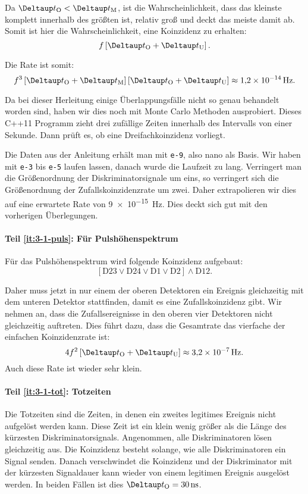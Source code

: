 \documentclass[11pt, ngerman, fleqn, DIV=15, headinclude, BCOR=2cm]{scrreprt}
\begin{document}
Da $\DtO < \DtM$, ist die Wahrscheinlichkeit, dass das kleinste komplett
innerhalb des größten ist, relativ groß und deckt das meiste damit ab. Somit
ist hier die Wahrscheinlichkeit, eine Koinzidenz zu erhalten:
\[
    f \sbr{\DtO + \DtU}.
\]

Die Rate ist somit:
\[
    f^3 \sbr{\DtO + \DtM} \sbr{\DtO + \DtU} \approx \SI{1.2e-14}{\hertz}.
\]

Da bei dieser Herleitung einige Überlappungsfälle nicht so genau behandelt
worden sind, haben wir dies noch mit Monte Carlo Methoden ausprobiert. Dieses
C++11 Programm zieht drei zufällige Zeiten innerhalb des Intervalls von einer
Sekunde. Dann prüft es, ob eine Dreifachkoinzidenz vorliegt.



Die Daten aus der Anleitung erhält man mit \texttt{e-9}, also nano als Basis.
Wir haben mit \texttt{e-3} bis \texttt{e-5} laufen lassen, danach wurde die
Laufzeit zu lang. Verringert man die Größenordnung der Diskriminatorsignale um
eins, so verringert sich die Größenordnung der Zufallskoinzidenzrate um zwei.
Daher extrapolieren wir dies auf eine erwartete Rate von \SI{9e-15}{\hertz}.
Dies deckt sich gut mit den vorherigen Überlegungen.

\paragraph{Teil \ref{it:3-1-puls}: Für Pulshöhenspektrum}

Für das Pulshöhenspektrum wird folgende Koinzidenz aufgebaut:
\[
    [\mathrm D23 \lor \mathrm D24 \lor \mathrm D1 \lor \mathrm D2] \land
    \mathrm D12.
\]

Daher muss jetzt in nur einem der oberen Detektoren ein Ereignis gleichzeitig
mit dem unteren Detektor stattfinden, damit es eine Zufallskoinzidenz gibt. Wir
nehmen an, dass die Zufallsereignisse in den oberen vier Detektoren nicht
gleichzeitig auftreten. Dies führt dazu, dass die Gesamtrate das vierfache der
einfachen Koinzidenzrate ist:
\[
    4 f^2 \sbr{\DtO + \DtU} \approx \SI{3.2e-7}{\hertz}.
\]
Auch diese Rate ist wieder sehr klein.

\paragraph{Teil \ref{it:3-1-tot}: Totzeiten}

Die Totzeiten sind die Zeiten, in denen ein zweites legitimes Ereignis nicht
aufgelöst werden kann. Diese Zeit ist ein klein wenig größer als die Länge des
kürzesten Diskriminatorsignals. Angenommen, alle Diskriminatoren lösen
gleichzeitig aus. Die Koinzidenz besteht solange, wie alle Diskriminatoren ein
Signal senden. Danach verschwindet die Koinzidenz und der Diskriminator mit der
kürzesten Signaldauer kann wieder von einem legitimen Ereignis ausgelöst
werden. In beiden Fällen ist dies $\DtO = \SI{30}{\nano\second}$.
\end{document}
